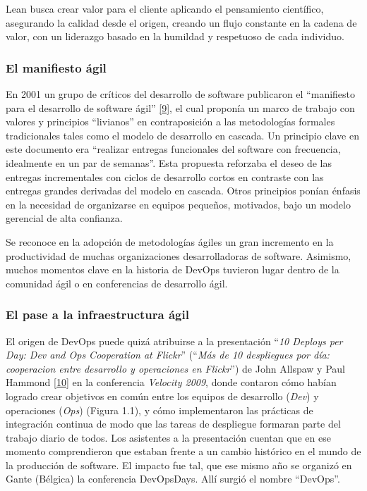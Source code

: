 Lean busca crear valor para el cliente aplicando el pensamiento científico, asegurando la calidad desde el origen, creando un flujo constante en la cadena de valor, con un liderazgo basado en la humildad y respetuoso de cada individuo.

\subsubsection{El manifiesto ágil}

En 2001 un grupo de críticos del desarrollo de software publicaron el “manifiesto para el desarrollo de software ágil” \href{https://www.zotero.org/google-docs/?gn91v6}{[9]}, el cual proponía un marco de trabajo con valores y principios “livianos” en contraposición a las metodologías formales tradicionales tales como el modelo de desarrollo en cascada. Un principio clave en este documento era “realizar entregas funcionales del software con frecuencia, idealmente en un par de semanas”. Esta propuesta reforzaba el deseo de las entregas incrementales con ciclos de desarrollo cortos en contraste con las entregas grandes derivadas del modelo en cascada. Otros principios ponían énfasis en la necesidad de organizarse en equipos pequeños, motivados, bajo un modelo gerencial de alta confianza.

Se reconoce en la adopción de metodologías ágiles un gran incremento en la productividad de muchas organizaciones desarrolladoras de software. Asimismo, muchos momentos clave en la historia de DevOps tuvieron lugar dentro de la comunidad ágil o en conferencias de desarrollo ágil.

\subsubsection{El pase a la infraestructura ágil}

El origen de DevOps puede quizá atribuirse a la presentación “\textit{10 Deploys per Day: Dev and Ops Cooperation at Flickr}” (“\textit{Más de 10 despliegues por día: cooperacion entre desarrollo y operaciones en Flickr}”) de John Allspaw y Paul Hammond \href{https://www.zotero.org/google-docs/?9iahAj}{[10]} en la conferencia \textit{Velocity 2009}, donde contaron cómo habían logrado crear objetivos en común entre los equipos de desarrollo (\textit{Dev}) y operaciones (\textit{Ops}) (Figura 1.1), y cómo implementaron las prácticas de integración continua de modo que las tareas de despliegue formaran parte del trabajo diario de todos. Los asistentes a la presentación cuentan que en ese momento comprendieron que estaban frente a un cambio histórico en el mundo de la producción de software. El impacto fue tal, que ese mismo año se organizó en Gante (Bélgica) la conferencia DevOpsDays. Allí surgió el nombre “DevOps”.

